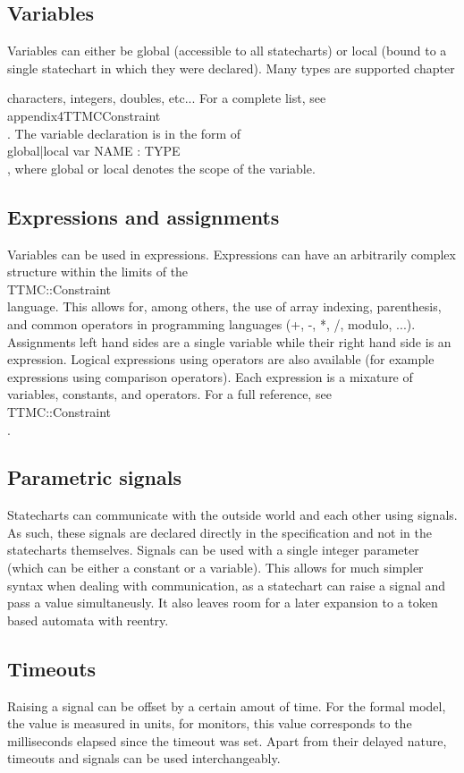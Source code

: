   \subsection{Variables}
Variables can either be global (accessible to all statecharts) or local (bound to a single statechart in which they were declared). Many types are supported chapter{ characters, integers, doubles, etc... For a complete list, see \\appendix4TTMCConstraint\\. The variable declaration is in the form of \\global|local var NAME : TYPE\\, where global or local denotes the scope of the variable.
  \subsection{Expressions and assignments}
Variables can be used in expressions. Expressions can have an arbitrarily complex structure within the limits of the \\TTMC::Constraint\\ language. This allows for, among others, the use of array indexing, parenthesis, and common operators in programming languages (+, -, *, /, modulo, ...). Assignments left hand sides are a single variable while their right hand side is an expression. Logical expressions using operators are also available (for example expressions using comparison operators). Each expression is a mixature of variables, constants, and operators. For a full reference, see \\TTMC::Constraint\\.
  \subsection{Parametric signals}
Statecharts can communicate with the outside world and each other using signals. As such, these signals are declared directly in the specification and not in the statecharts themselves. Signals can be used with a single integer parameter (which can be either a constant or a variable). This allows for much simpler syntax when dealing with communication, as a statechart can raise a signal and pass a value simultaneusly. It also leaves room for a later expansion to a token based automata with reentry.
  \subsection{Timeouts}
Raising a signal can be offset by a certain amout of time. For the formal model, the value is measured in units, for monitors, this value corresponds to the milliseconds elapsed since the timeout was set. Apart from their delayed nature, timeouts and signals can be used interchangeably.
}
